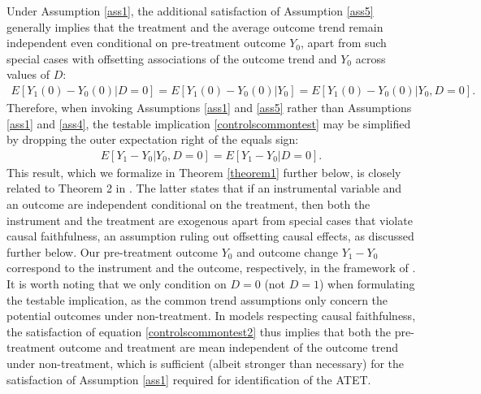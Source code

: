 {Under Assumption \ref{ass1}, the additional satisfaction of Assumption \ref{ass5} generally implies that the treatment and the average outcome trend remain independent even conditional on pre-treatment outcome $Y_0$, apart from such special cases with offsetting associations of the outcome trend and $Y_0$ across values of $D$:
\begin{eqnarray}\label{equalities}
	E[Y_1(0)-Y_0(0)|D=0]=E[Y_1(0)-Y_0(0)|Y_0]=E[Y_1(0)-Y_0(0)|Y_0, D=0].
\end{eqnarray}
Therefore, when invoking Assumptions \ref{ass1} and \ref{ass5} rather than Assumptions \ref{ass1} and \ref{ass4}, the testable implication \eqref{controlscommontest} may be simplified by dropping the outer expectation right of the equals sign:
	\begin{eqnarray}\label{controlscommontest2}
		E[Y_1-Y_0|Y_0,D=0]=E[Y_1-Y_0|D=0].
	\end{eqnarray}
	This result, which we formalize in Theorem \ref{theorem1} further below, is closely related to Theorem 2 in \cite{HuberKueck2022}. The latter states that if an instrumental variable and an outcome are independent conditional on the treatment, then both the instrument and the treatment are exogenous apart from special cases that violate causal faithfulness, an assumption ruling out offsetting causal effects, as discussed further below. Our pre-treatment outcome $Y_0$ and outcome change $Y_1-Y_0$ correspond to the instrument and the outcome, respectively, in the framework of \cite{HuberKueck2022}. It is worth noting that we only condition on $D=0$ (not $D=1$) when formulating the testable implication, as the common trend assumptions only concern the potential outcomes under non-treatment. In models respecting causal faithfulness, the satisfaction of equation \eqref{controlscommontest2} thus implies that both the pre-treatment outcome and treatment are mean independent of the outcome trend under non-treatment, which is sufficient (albeit stronger than necessary) for the satisfaction of Assumption \ref{ass1} required for identification of the ATET.
	
}
